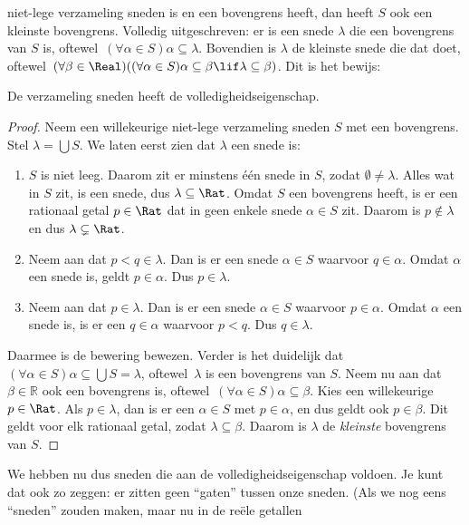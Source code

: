 \documentclass[openany]{memoir}
\begin{document}
niet-lege verzameling sneden is
en een bovengrens heeft, dan heeft $S$ ook een kleinste bovengrens.
Volledig uitgeschreven: er is een snede $\lambda$ die een bovengrens
van $S$ is, oftewel\ $(\forall \alpha \in S)\alpha \subseteq
\lambda$. Bovendien is $\lambda$ de kleinste snede die dat doet,
oftewel\ $(\forall \beta \in \Real)((\forall \alpha \in S)\alpha \subseteq \beta \lif \lambda \subseteq \beta)$. Dit
is het bewijs:
\begin{thm}
De verzameling sneden heeft de volledigheidseigenschap.
\end{thm}
\begin{proof}
Neem een willekeurige niet-lege verzameling sneden $S$ met een
bovengrens. Stel $\lambda = \bigcup S$.
We laten eerst zien dat $\lambda$ een snede is:
\begin{enumerate}
\item $S$ is niet leeg. Daarom zit er minstens één snede in
$S$, zodat $\emptyset \neq \lambda$. Alles wat in $S$ zit, is een snede,
dus $\lambda \subseteq \Rat$. Omdat $S$ een bovengrens heeft, is er
een rationaal getal $p \in \Rat$ dat in geen enkele snede $\alpha \in S$
zit. Daarom
is $p\notin \lambda$ en dus $\lambda \subsetneq \Rat$.
\item Neem aan dat $p < q \in \lambda$. Dan is er een snede $\alpha \in S$
waarvoor $q \in \alpha$. Omdat $\alpha$ een snede is, geldt
$p \in \alpha$. Dus $p \in \lambda$.
\item Neem aan dat $p \in \lambda$. Dan is er een snede $\alpha \in S$
waarvoor $p \in \alpha$. Omdat $\alpha$ een snede is, is er een
$q \in \alpha$ waarvoor $p < q$. Dus $q \in \lambda$.
\end{enumerate}
Daarmee is de bewering bewezen. Verder is het duidelijk dat $(\forall \alpha \in S)\alpha
\subseteq \bigcup S = \lambda$, oftewel\ $\lambda$ is een bovengrens van $S$. Neem nu aan dat $\beta \in \mathbb{R}$ ook een bovengrens is, oftewel\ $(\forall \alpha \in S)\alpha \subseteq \beta$. Kies een willekeurige $p \in \Rat$. Als $p \in \lambda$, dan is er een $\alpha \in S$ met $p \in \alpha$, en dus geldt ook $p \in \beta$. Dit geldt voor elk rationaal getal, zodat $\lambda \subseteq \beta$. Daarom is $\lambda$ de \emph{kleinste} bovengrens van $S$.
\end{proof}
We hebben nu dus sneden die aan de volledigheidseigenschap voldoen.
Je kunt dat ook zo zeggen: er zitten geen “gaten” tussen onze sneden.
(Als we nog eens “sneden” zouden maken, maar nu in de reële getallen
\end{document}

